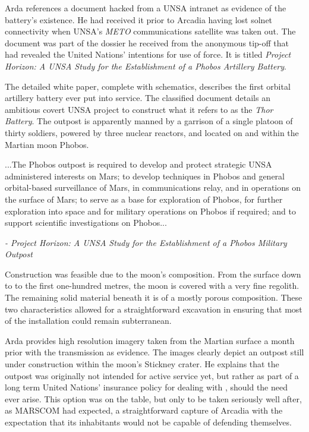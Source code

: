 Arda references a document hacked from a UNSA intranet as evidence of the battery's existence. He had received it prior to Arcadia having lost solnet connectivity when UNSA's {\it METO} communications satellite was taken out. The document was part of the dossier he received from the anonymous tip-off that had revealed the United Nations' intentions for use of force. It is titled {\it Project Horizon: A UNSA Study for the Establishment of a Phobos Artillery Battery}.

The detailed white paper, complete with schematics, describes the first orbital artillery battery ever put into service. The classified document details an ambitious covert UNSA project to construct what it refers to as the {\it Thor Battery}. The outpost is apparently manned by a garrison of a single platoon of thirty soldiers, powered by three nuclear reactors, and located on and within the Martian moon Phobos. 

\startTimelineGeneralDocument
...The Phobos outpost is required to develop and protect strategic UNSA administered interests on Mars; to develop techniques in Phobos and general orbital-based surveillance of Mars, in communications relay, and in operations on the surface of Mars; to serve as a base for exploration of Phobos, for further exploration into space and for military operations on Phobos if required; and to support scientific investigations on Phobos...

\hskip 1.5cm {\it - Project Horizon: A UNSA Study for the Establishment of a Phobos Military Outpost}
\stopTimelineGeneralDocument

Construction was feasible due to the moon's composition. From the surface down to to the first one-hundred metres, the moon is covered with a very fine regolith. The remaining solid material beneath it is of a mostly porous composition. These two characteristics allowed for a straightforward excavation in ensuring that most of the installation could remain subterranean.

Arda provides high resolution imagery taken from the Martian surface a month prior with the transmission as evidence. The images clearly depict an outpost still under construction within the moon's Stickney crater. He explains that the outpost was originally not intended for active service yet, but rather as part of a long term United Nations' insurance policy for dealing with , should the need ever arise. This option was on the table, but only to be taken seriously well after, as MARSCOM had expected, a straightforward capture of Arcadia with the expectation that its inhabitants would not be capable of defending themselves.

